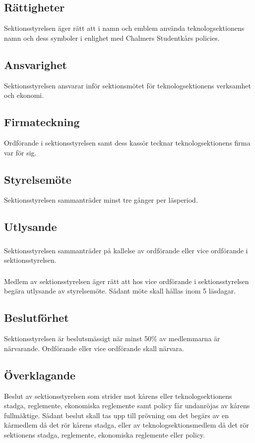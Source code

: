 \documentclass[a4paper]{dtek}
\begin{document}
\subsection{Rättigheter}
Sektionsstyrelsen äger rätt att i namn och emblem använda teknologsektionens namn och dess symboler i enlighet med Chalmers Studentkårs policies.
\subsection{Ansvarighet}
Sektionsstyrelsen ansvarar inför sektionsmötet för teknologsektionens verksamhet och ekonomi.
\subsection{Firmateckning}
Ordförande i sektionsstyrelsen samt dess kassör tecknar teknologsektionens firma var för sig.
\subsection{Styrelsemöte}
Sektionsstyrelsen sammanträder minst tre gånger per läsperiod.
\subsection{Utlysande}
\subsubsection{}
Sektionsstyrelsen sammanträder på kallelse av ordförande eller vice ordförande i sektionsstyrelsen.
\subsubsection{}
Medlem av sektionsstyrelsen äger rätt att hos vice ordförande i sektionsstyrelsen begära utlysande av styrelsemöte. Sådant möte skall hållas inom 5 läsdagar.
\subsection{Beslutförhet}
Sektionsstyrelsen är beslutsmässigt när minst 50\% av medlemmarna är närvarande. Ordförande eller vice ordförande skall närvara.
\subsection{Överklagande}
Beslut av sektionsstyrelsen som strider mot kårens eller teknologsektionens stadga, reglemente, ekonomiska reglemente samt policy får undanröjas av kårens fullmäktige. Sådant beslut skall tas upp till prövning om det begärs av en kårmedlem då det rör kårens stadga, eller av teknologsektionsmedlem då det rör sektionens stadga, reglemente, ekonomiska reglemente eller policy.
\end{document}
